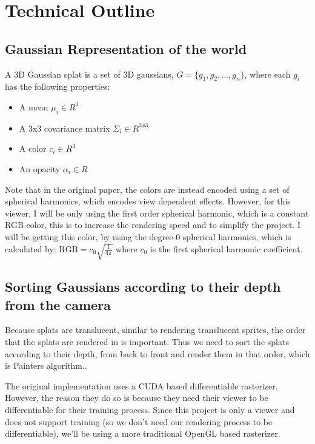 \documentclass {article}
\begin{document}
\section{Technical Outline}
\subsection{Gaussian Representation of the world}

     A 3D Gaussian splat is a set of 3D gaussians, $G = \{g_1, g_2, ..., g_n\}$, where each $g_i$ has the following properties:
     \begin{itemize}
     \item A mean $\mu_i \in R^3$
     \item A 3x3 covariance matrix $\Sigma_i \in R^{3x3}$
     \item A color $c_i \in R^3$
     \item An opacity $\alpha_i \in R$
     \end{itemize}

     Note that in the original paper, the colors are instead encoded using a set of spherical harmonics, which encodes view dependent effects. However, for this viewer, I will be only using the first order spherical harmonic, which is a constant RGB color, this is to increase the rendering speed and to simplify the project. I will be getting this color, by using the degree-0 spherical harmonics, which is calculated by:
     $\text{RGB} = c_0 \sqrt{\frac{1}{4\pi}}$
     where $c_0$ is the first spherical harmonic coefficient.
     \\

     
     \subsection{Sorting Gaussians according to their depth from the camera}
     Because splats are translucent, similar to rendering translucent sprites, the order that the splats are rendered in is important. Thus we need to sort the splats according to their depth, from back to front and render them in that order, which is Painters algorithm..

     The original implementation uses a CUDA based differentiable rasterizer. However, the reason they do so is because they need their viewer to be differentiable for their training process. Since this project is only a viewer and does not support training (so we don't need our rendering process to be differentiable), we'll be using a more traditional OpenGL based rasterizer.
\end{document}
